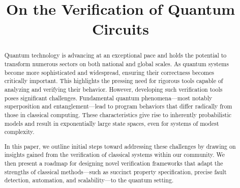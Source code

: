 

\title{On the Verification of Quantum Circuits}

\maketitle




\begin{abstract}
Quantum technology is advancing at an exceptional pace and holds the potential to transform numerous sectors on both national and global scales. 
%
As quantum systems become more sophisticated and widespread, ensuring their correctness becomes critically important. This highlights the pressing need for rigorous tools capable of analyzing and verifying their behavior.
%
However, developing such verification tools poses significant challenges. Fundamental quantum phenomena—most notably superposition and entanglement—lead to program behaviors that differ radically from those in classical computing. These characteristics give rise to inherently probabilistic models and result in exponentially large state spaces, even for systems of modest complexity.
%

In this paper, we outline initial steps toward addressing these challenges by drawing on insights gained from the verification of classical systems within our community.
%
We then present a roadmap for designing novel verification frameworks that adapt the strengths of classical methods—such as succinct property specification, precise fault detection, automation, and scalability—to the quantum setting.
%
\end{abstract}
